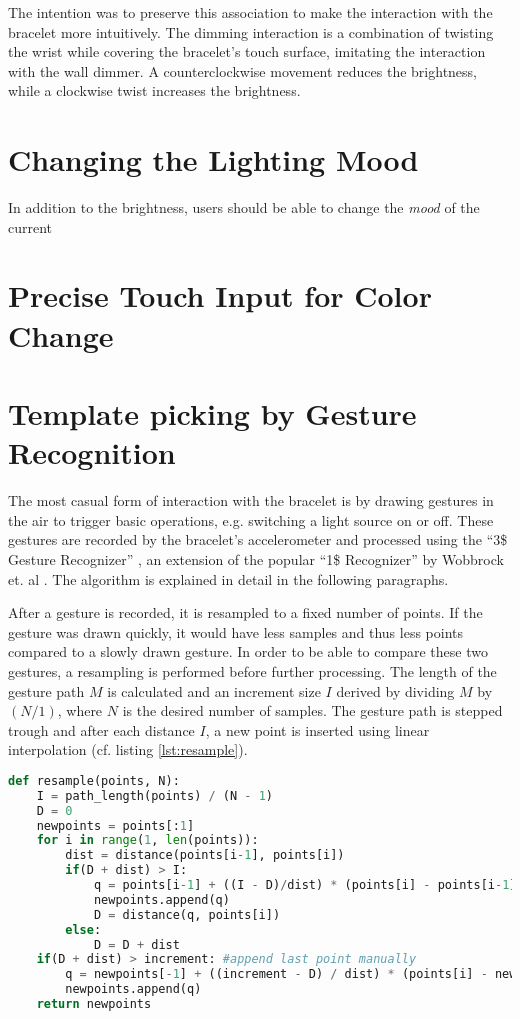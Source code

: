 The intention was to preserve this association to make the interaction with the bracelet more intuitively. The dimming interaction is a combination of twisting the wrist while covering the bracelet's touch surface, imitating the interaction with the wall dimmer. A counterclockwise movement reduces the brightness, while a clockwise twist increases the brightness.

\section{Changing the Lighting Mood}
In addition to the brightness, users should be able to change the \textit{mood} of the current 

\section{Precise Touch Input for Color Change}

\section{Template picking by Gesture Recognition}
The most casual form of interaction with the bracelet is by drawing gestures in the air to trigger basic operations, e.g. switching a light source on or off. These gestures are recorded by the bracelet's accelerometer and processed using the ``3\$ Gesture Recognizer'' \cite{Kratz2010}, an extension of the popular ``1\$ Recognizer'' by Wobbrock et. al \cite{Wobbrock2007}. The algorithm is explained in detail in the following paragraphs.

After a gesture is recorded, it is resampled to a fixed number of points. If the gesture was drawn quickly, it would have less samples and thus less points compared to a slowly drawn gesture. In order to be able to compare these two gestures, a resampling is performed before further processing. The length of the gesture path $M$ is calculated and an increment size $I$ derived by dividing $M$ by $(N/1)$, where $N$ is the desired number of samples. The gesture path is stepped trough and after each distance $I$, a new point is inserted using linear interpolation (cf. listing \ref{lst:resample}). %

\begin{lstlisting}[label=lst:resample,language=python,frame=lt,caption=Resampling of a points path into N evenly spaced points]
def resample(points, N):
	I = path_length(points) / (N - 1)
	D = 0
	newpoints = points[:1]
	for i in range(1, len(points)):
		dist = distance(points[i-1], points[i])
		if(D + dist) > I:
			q = points[i-1] + ((I - D)/dist) * (points[i] - points[i-1])
			newpoints.append(q)
			D = distance(q, points[i])
		else:
			D = D + dist
	if(D + dist) > increment: #append last point manually
		q = newpoints[-1] + ((increment - D) / dist) * (points[i] - newpoints[-1])
		newpoints.append(q)
	return newpoints
\end{lstlisting}

